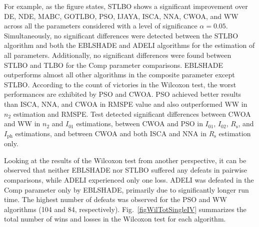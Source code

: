 \documentclass[a4paper,fleqn]{cas-sc}
\begin{document}
For example, as the figure states, STLBO shows a significant improvement over
DE, NDE, MABC, GOTLBO, PSO, IJAYA, ISCA, NNA, CWOA, and WW across all the parameters
considered with a level of significance $\alpha = 0.05$.
Simultaneously, no significant differences were detected between the STLBO algorithm
and both the EBLSHADE and ADELI algorithms for the estimation of all parameters.
Additionally, no significant differences were found between STLBO and TLBO for the Comp parameter comparisons.
EBLSHADE outperforms almost all other algorithms in the composite parameter except STLBO.
According to the count of victories in the Wilcoxon test,
the worst performances are exhibited by PSO and CWOA.
PSO achieved better results than ISCA, NNA, and CWOA in RMSPE value and
also outperformed WW in $n_2$ estimation and RMSPE.
Test detected significant differences between CWOA and WW in $n_2$ and $I_{01}$ estimations,
between CWOA and PSO in $I_{01}$, $I_{02}$, $R_\mathrm{s}$, and $I_\mathrm{ph}$ estimations,
and between CWOA and both ISCA and NNA in $R_\mathrm{s}$  estimation only.

Looking at the results of the Wilcoxon test from another perspective,
it can be observed that neither EBLSHADE nor STLBO suffered any defeats in pairwise comparisons,
while ADELI experienced only one loss.
ADELI was defeated in the Comp parameter only by  EBLSHADE,
primarily due to significantly longer run time.
The highest number of defeats was observed for the PSO and WW algorithms
(104 and 84, respectively).
Fig.~\ref{figWilTotSingleIV} summarizes the total number of wins and losses in the Wilcoxon test for each algorithm.
\end{document}
